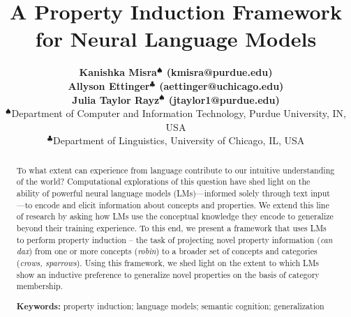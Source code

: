 \documentclass[10pt,letterpaper]{article}
\title{A Property Induction Framework for Neural Language Models}
\author{
{\large \bf Kanishka Misra$^{\spadesuit}$ (kmisra@purdue.edu)\\
\large \bf Allyson Ettinger$^{\clubsuit}$ (aettinger@uchicago.edu) \\
\large \bf Julia Taylor Rayz$^{\spadesuit}$ (jtaylor1@purdue.edu)} \\
  $^{\spadesuit}$Department of Computer and Information Technology,
  Purdue University, IN, USA \\
  $^{\clubsuit}$Department of Linguistics, University of Chicago, IL, USA
}
\begin{document}
\maketitle


\begin{abstract}
To what extent can experience from language contribute to our intuitive understanding of the world? Computational explorations of this question have shed light on the ability of powerful neural language models (LMs)---informed solely through text input---to encode and elicit information about concepts and properties. We extend this line of research by asking how LMs use the conceptual knowledge they encode to generalize beyond their training experience. To this end, we present a framework that uses LMs to perform property induction -- the task of projecting novel property information (\textit{can dax}) from one or more concepts (\textit{robin}) to a broader set of concepts and categories (\textit{crows, sparrows}). Using this framework, we shed light on the extent to which LMs show an inductive preference to generalize novel properties on the basis of category membership.

\textbf{Keywords:} 
property induction; language models; semantic cognition; generalization
\end{abstract}
\end{document}
